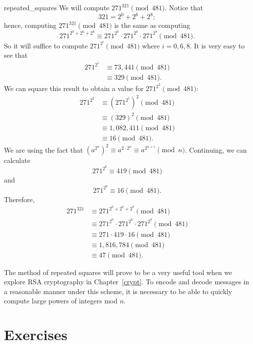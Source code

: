  
\begin{example}{repeated_squares}
We will compute $271^{321} \pmod{ 481}$. Notice that
\[
321 = 2^0 +2^6 + 2^8;
\]
hence, computing $271^{ 321} \pmod{ 481}$ is the same as computing
\[
271^{ 2^0 +2^6 + 2^8 } \equiv 271^{ 2^0 } \cdot 271^{2^6 } \cdot 271^{ 2^8 } \pmod{ 481}.
\]
So it will suffice to compute $271^{ 2^i } \pmod{ 481}$ where $i = 0,
6, 8$. It is very easy to see that 
\begin{align*}
271^{ 2^1}  & \equiv 73,441 \pmod{ 481}  \\
& \equiv 329 \pmod{ 481}.
\end{align*}
We can square this result to obtain a value for $271^{ 2^2} \pmod{481}$: 
\begin{align*}
271^{ 2^2}  & \equiv (271^{ 2^1})^2 \pmod{ 481} \\ 
& \equiv (329)^2 \pmod{ 481} \\
& \equiv 1,082,411 \pmod{ 481} \\
& \equiv 16 \pmod{ 481}.
\end{align*}
We are using the fact that $(a^{2^n})^2  \equiv a^{2 \cdot 2^n} \equiv
a^{ 2^{n+1} } \pmod{ n}$. Continuing, we can calculate
\[
271^{ 2^6 } \equiv 419 \pmod{ 481}
\]
and
\[
271^{ 2^8 }  \equiv 16 \pmod{ 481}.
\]
Therefore,
\begin{align*}
271^{ 321}
& \equiv 271^{ 2^0 +2^6 + 2^8 } \pmod{ 481} \\
& \equiv 271^{ 2^0 } \cdot 271^{ 2^6 } \cdot 271^{ 2^8 } \pmod{ 481} \\
& \equiv 271 \cdot 419 \cdot 16 \pmod{ 481} \\
& \equiv 1,816,784 \pmod{ 481} \\
& \equiv 47 \pmod{ 481}.
\end{align*}
\end{example}
 
 
The method of repeated squares will prove to be a very useful tool
when we explore  RSA cryptography  in Chapter~\ref{crypt}. To encode and decode
messages in a reasonable manner under this scheme, it is necessary to
be able to quickly compute large powers of integers mod $n$.
 
 
\section*{Exercises}
\exrule
 
 
 
